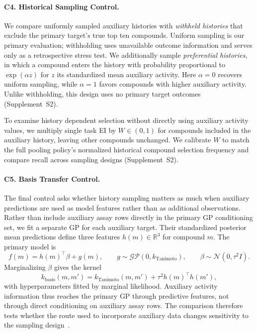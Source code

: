 \documentclass[10pt,letterpaper,runningheads]{llncs}
\begin{document}
\paragraph{C4. Historical Sampling Control.}
We compare uniformly sampled auxiliary histories with
\emph{withheld histories} that exclude the primary
target's true top ten compounds. Uniform sampling is
our primary evaluation; withholding uses unavailable
outcome information and serves only as a retrospective
stress test. We additionally sample \emph{preferential
histories}, in which a compound enters the history with
probability proportional to $\exp(\alpha z)$ for $z$ its
standardized mean auxiliary activity. Here $\alpha=0$
recovers uniform sampling, while $\alpha=1$ favors
compounds with higher auxiliary activity. Unlike
withholding, this design uses no primary target outcomes
(Supplement~S2).

To examine history dependent selection without directly
using auxiliary activity values, we multiply single task
EI by $W\in(0,1)$ for compounds included in the auxiliary
history, leaving other compounds unchanged. We calibrate
$W$ to match the full pooling policy's normalized
historical compound selection frequency and compare
recall across sampling designs (Supplement~S2).

\paragraph{C5. Basis Transfer Control.}
The final control asks whether history sampling matters as much
when auxiliary predictions are used as model features rather than
as additional observations. Rather than include
auxiliary assay rows directly in the primary GP conditioning set,
we fit a separate GP for each auxiliary target. Their standardized
posterior mean predictions define three features
$h(m)\in\mathbb{R}^{3}$ for compound $m$. The primary model is
\[
f(m)=h(m)^{\top}\beta+g(m),\qquad
g\sim\mathcal{GP}(0,k_{\mathrm{Tanimoto}}),\qquad
\beta\sim\mathcal{N}(0,\tau^{2}I).
\]
Marginalizing $\beta$ gives the kernel
\[
k_{\mathrm{basis}}(m,m')=
k_{\mathrm{Tanimoto}}(m,m')
+\tau^{2}h(m)^{\top}h(m'),
\]
with hyperparameters fitted by marginal likelihood.
Auxiliary activity information thus reaches the primary GP through
predictive features, not through direct conditioning on auxiliary assay
rows. The comparison
therefore tests whether the route used to incorporate auxiliary data
changes sensitivity to the sampling design~\cite{tighineanu2021transfer}.
\end{document}
